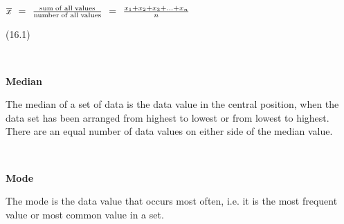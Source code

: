 \begin{description}
\begin{description}
{\begin{equation}
      \end{equation}
    }{%
    \setlength{\mymathboxwidth}{\columnwidth}
      \addtolength{\mymathboxwidth}{-48pt}
    \par\vspace{12pt}\noindent\begin{minipage}{\columnwidth}
    \parbox[t]{\mymathboxwidth}{\large$
    \overline{x}\phantom{\rule{4pt}{0ex}}=\phantom{\rule{4pt}{0ex}}\frac{\mathrm{sum\; of\; all\; values}}{\mathrm{number\; of\; all\; values}}\phantom{\rule{4pt}{0ex}}=\phantom{\rule{4pt}{0ex}}\frac{{x}_{1}+{x}_{2}+{x}_{3}+...+{x}_{n}}{n}$}\hfill
    \parbox[t]{48pt}{\raggedleft 
    (16.1)}
    \end{minipage}\vspace{12pt}\par
    }%
          \\\end{description}
	    \item[] \noindent\raggedright {\bf  Median }\\\begin{description}\item{\hspace{.3cm}}\hspace{.3cm}
          \label{m39400*id211687}The median of a set of data is the data value in the central position, when the data set has been arranged from highest to lowest or from lowest to highest. There are an equal number of data values on either side of the median value. \par 
          \\\end{description}
	    \item[] \noindent\raggedright {\bf  Mode }\\\begin{description}\item{\hspace{.3cm}}\hspace{.3cm}
          \label{m39400*id212182}The mode is the data value that occurs most often, i.e. it is the most frequent value or most common value in a set. \par 
          \\\end{description}
	    \vspace{.3cm}
	    \item[{\large \bfseries P}]\noindent\raggedright

\end{description}
